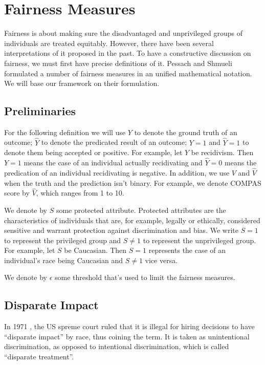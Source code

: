 \documentclass[conference]{IEEEtran}
\begin{document}
\section{Fairness Measures}
Fairness is about making sure the disadvantaged and unprivileged groups of individuals are treated equitably. However, there have been several interpretations of it proposed in the past. To have a constructive discussion on fairness, we must first have precise definitions of it. Pessach and Shmueli \cite{pessach2022review} formulated a number of fairness measures in an unified mathematical notation. We will base our framework on their formulation.

\subsection{Preliminaries}
For the following definition we will use $Y$ to denote the ground truth of an outcome; $\hat{Y}$ to denote the predicated result of an outcome; $Y = 1$ and $\hat{Y} = 1$ to denote them being accepted or positive. For example, let $Y$ be recidivism. Then $Y = 1$ means the case of an individual actually recidivating and $\hat{Y} = 0$ means the predication of an individual recidivating is negative. In addition, we use $V$ and $\hat{V}$ when the truth and the prediction isn't binary. For example, we denote COMPAS score by $\hat{V}$, which ranges from 1 to 10.

We denote by $S$ some protected attribute. Protected attributes are the characteristics of individuals that are, for example, legally or ethically, considered sensitive and warrant protection against discrimination and bias. We write $S = 1$ to represent the privileged group and $S \neq 1$ to represent the unprivileged group. For example, let $S$ be Caucasian. Then $S = 1$ represents the case of an individual's race being Caucasian and $S \neq 1$ vice versa.

We denote by $\epsilon$ some threshold that's used to limit the fairness measures.

\subsection{Disparate Impact}
In 1971 \cite{griggs1971}, the US spreme court ruled that it is illegal for hiring decisions to have  ``disparate impact'' by race, thus coining the term. It is taken as unintentional discrimination, as opposed to intentional discrimination, which is called ``disparate treatment''.
\end{document}

